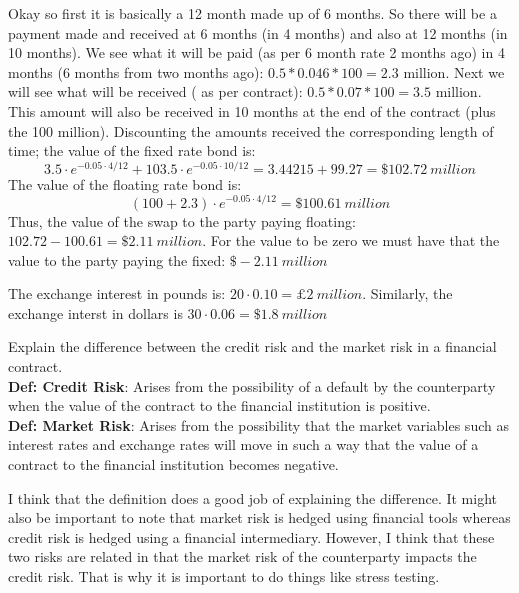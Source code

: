 \documentclass[12pt]{article}
\newenvironment{problem}[3][Problem]{\begin{trivlist}
\item[\hskip \labelsep {\bfseries #1}\hskip \labelsep {\bfseries #2.}]}{\end{trivlist}}
\begin{document}
\begin{problem}{7.3}. Okay so first it is basically a 12 month made up of 6 months. So there will be a payment made and received at 6 months (in 4 months) and also at 12 months (in 10 months). We see what it will be paid (as per 6 month rate 2 months ago) in 4 months (6 months from two months ago): $0.5*0.046*100=2.3$ million. Next we will see what will be received ( as per contract): $0.5*0.07*100=3.5$ million. This amount will also be received in 10 months at the end of the contract (plus the 100 million). Discounting the amounts received the corresponding length of time; the value of the fixed rate bond is: $$3.5\cdot e^{-0.05\cdot 4/12} + 103.5\cdot e^{-0.05\cdot 10/12} = 3.44215 + 99.27= \$ 102.72 \ million$$
The value of the floating rate bond is:
$$ (100+2.3)\cdot e^{-0.05\cdot 4/12} = \$100.61 \ million$$
Thus, the value of the swap to the party paying floating: $102.72-100.61 = \$ 2.11 \ million$. For the value to be zero we must have that the value to the party paying the fixed: $\$-2.11 \ million$
\end{problem}




\begin{problem}{7.5}. The exchange interest in pounds is: $20 \cdot 0.10 = \pounds 2 \ million$. Similarly, the exchange interst in dollars is $30 \cdot 0.06 = \$ 1.8 \  million$
\end{problem}

\begin{problem}{7.6}. Explain the difference between the credit risk and the market risk in a financial contract.\\
\textbf{Def: Credit Risk}: Arises from the possibility of a default by the counterparty when the value of the contract to the financial institution is positive. \\
\textbf{Def: Market Risk}: Arises from the possibility that the market variables such as interest rates and exchange rates will move in such a way that the value of a contract to the financial institution becomes negative. 

I think that the definition does a good job of explaining the difference. It might also be important to note that market risk is hedged using financial tools whereas credit risk is hedged using a financial intermediary. However, I think that these two risks are related in that the market risk of the counterparty impacts the credit risk. That is why it is important to do things like stress testing. 
\end{problem}
\end{document}
